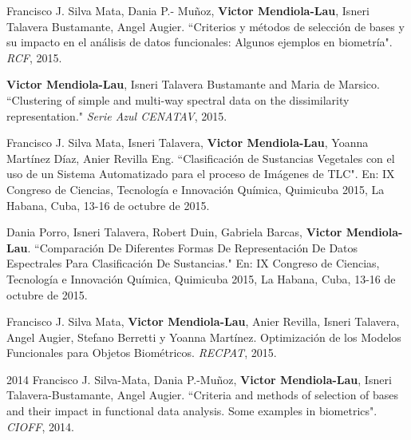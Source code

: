 \documentclass[]{friggeri-cv}
\begin{document}
\begin{paperlist}
  \paperentry
    {}
    {}
    {}
    {
		Francisco J. Silva Mata, Dania P.- Muñoz, \textbf{Victor Mendiola-Lau}, Isneri Talavera Bustamante, Angel Augier. ``Criterios y métodos de selección de bases y su impacto en el análisis de datos funcionales: Algunos ejemplos en biometría". \emph{RCF}, 2015.
    }
\end{paperlist}

\begin{paperlist}
  \paperentry
    {}
    {}
    {}
    {
		\textbf{Victor Mendiola-Lau}, Isneri Talavera Bustamante and Maria de Marsico. ``Clustering of simple and multi-way spectral data on the dissimilarity representation." \emph{Serie Azul CENATAV}, 2015.
    }
\end{paperlist}

\begin{paperlist}
  \paperentry
    {}
    {}
    {}
    {
		Francisco J. Silva Mata,  Isneri Talavera, \textbf{Victor Mendiola-Lau}, Yoanna Martínez Díaz, Anier Revilla Eng. ``Clasificación de Sustancias Vegetales con el uso de un Sistema Automatizado para el proceso de Imágenes de TLC". En: IX Congreso de Ciencias, Tecnología e Innovación Química, Quimicuba 2015, La Habana, Cuba, 13-16 de octubre de 2015.
    }
\end{paperlist}

\begin{paperlist}
  \paperentry
    {}
    {}
    {}
    {
		Dania Porro, Isneri Talavera, Robert Duin, Gabriela Barcas, \textbf{Victor Mendiola-Lau}. ``Comparación De Diferentes Formas De Representación De Datos Espectrales Para Clasificación De Sustancias." En: IX Congreso de Ciencias, Tecnología e Innovación Química, Quimicuba 2015, La Habana, Cuba, 13-16 de octubre de 2015.
    }
\end{paperlist}

\begin{paperlist}
  \paperentry
    {}
    {}
    {}
    {
		Francisco J. Silva Mata, \textbf{Victor Mendiola-Lau}, Anier Revilla, Isneri Talavera, Angel Augier, Stefano Berretti y Yoanna Martínez. Optimización de los Modelos Funcionales para Objetos Biométricos. \emph{RECPAT}, 2015.
    }
\end{paperlist}

\vspace{0.5cm}

\begin{paperlist}
  \paperentry
    {2014}
    {}
    {}
    {
		Francisco J. Silva-Mata, Dania P.-Muñoz, \textbf{Victor Mendiola-Lau}, Isneri Talavera-Bustamante, Angel Augier. ``Criteria and methods of selection of bases and their impact in functional data analysis. Some examples in biometrics". \emph{CIOFF}, 2014.
    }
\end{paperlist}
\end{document}
